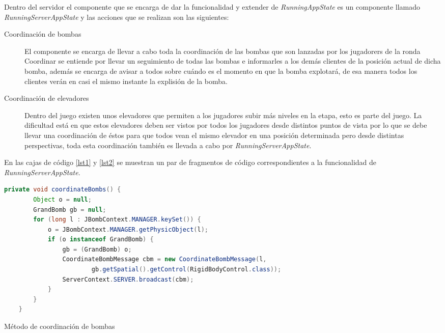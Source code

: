 \documentclass[a4paper,12pt,openany,oneside]{book}
\begin{document}
Dentro del servidor el componente que se encarga de dar la funcionalidad y extender de \textit{RunningAppState} es un componente llamado \textit{RunningServerAppState} y las acciones que se realizan son las siguientes:
\begin{description}
\item[Coordinación de bombas] El componente se encarga de llevar a cabo toda la coordinación de las bombas que son lanzadas por los jugadorers de la ronda Coordinar se entiende por llevar un seguimiento de todas las bombas e informarles a los demás clientes de la posición actual de dicha bomba, además se encarga de avisar a todos sobre cuándo es el momento en que la bomba explotará, de esa manera todos los clientes verán en casi el mismo instante la explisión de la bomba.
\item[Coordinación de elevadores] Dentro del juego existen unos elevadores que permiten a los jugadores subir más niveles en la etapa, esto es parte del juego. La dificultad está en que estos elevadores deben ser vistos por todos los jugadores desde distintos puntos de vista por lo que se debe llevar una coordinación de éstos para que todos vean el mismo elevador en una posición determinada pero desde distintas perspectivas, toda esta coordinación también es llevada a cabo por \textit{RunningServerAppState}.
\end{description}
En las cajas de código \ref{lst1} y \ref{lst2} se muestran un par de fragmentos de código correspondientes a la funcionalidad de \textit{RunningServerAppState}.
\begin{codigo}
\begin{lstlisting}[language=Java,frame=single,basicstyle=\scriptsize]
private void coordinateBombs() {
        Object o = null;
        GrandBomb gb = null;
        for (long l : JBombContext.MANAGER.keySet()) {
            o = JBombContext.MANAGER.getPhysicObject(l);
            if (o instanceof GrandBomb) {
                gb = (GrandBomb) o;
                CoordinateBombMessage cbm = new CoordinateBombMessage(l,
                        gb.getSpatial().getControl(RigidBodyControl.class));
                ServerContext.SERVER.broadcast(cbm);
            }
        }
    }
\end{lstlisting}
\caption{Método de coordinación de bombas}
\label{lst1}
\end{codigo}
\newpage
\end{document}
